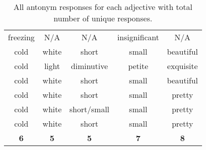 \begin{table}
\begin{center}
\begin{tabular}{|c|c|c|c|c|}
			freezing	&	N/A	&	N/A	&	insignificant	&	N/A		\\
			cold	&	white	&	short	&	small	&	beautiful		\\
			cold	&	light	&	diminutive	&	petite	&	exquisite		\\
			cold	&	white	&	short	&	small	&	beautiful		\\
			cold	&	white	&	short	&	small	&	pretty		\\
			cold	&	white	&	short/small	&	small	&	pretty		\\
			cold	&	white	&	short	&	small	&	pretty		\\ \hline
			\textbf{6}	&	\textbf{5}	&	\textbf{5}	&	\textbf{7}	&	\textbf{8}		\\
			\hline
		\end{tabular}
	\end{center}
	\caption {All antonym responses for each adjective with total number of unique responses.}
	\label{tab:all_adjective}
\end{table}

